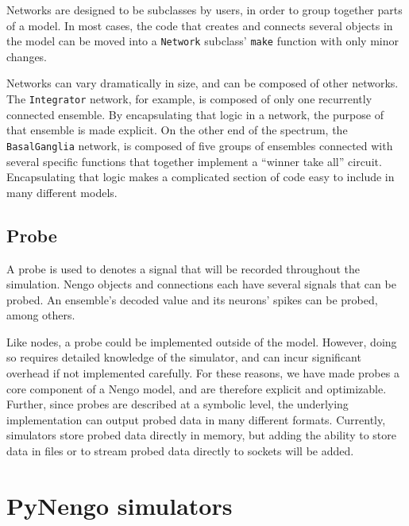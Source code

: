 \documentclass{frontiersSCNS}
\begin{document}
Networks are designed to be
subclasses by users,
in order to group together
parts of a model.
In most cases,
the code that creates and connects
several objects in the model can be
moved into a \texttt{Network}
subclass' \texttt{make}
function with only minor changes.

Networks can vary dramatically in size,
and can be composed of other networks.
The \texttt{Integrator} network, for example,
is composed of only one recurrently connected ensemble.
By encapsulating that logic in a network,
the purpose of that ensemble is made explicit.
On the other end of the spectrum,
the \texttt{BasalGanglia} network,
is composed of five groups of ensembles
connected with several specific functions
that together implement a ``winner take all'' circuit.
Encapsulating that logic
makes a complicated section of code
easy to include in many different models.

\subsection{Probe}

A probe is used to denotes a signal
that will be recorded
throughout the simulation.
Nengo objects and connections
each have several signals that can be probed.
An ensemble's decoded value
and its neurons' spikes
can be probed, among others.

Like nodes, a probe could be implemented
outside of the model.
However, doing so requires detailed knowledge
of the simulator,
and can incur significant overhead
if not implemented carefully.
For these reasons, we have made probes
a core component of a Nengo model,
and are therefore explicit
and optimizable.
Further, since probes are described
at a symbolic level,
the underlying implementation
can output probed data in many different formats.
Currently, simulators store probed data
directly in memory,
but adding the ability to store data
in files or to stream probed data
directly to sockets will be added.

\section{PyNengo simulators} \label{sec:simulators}
\end{document}
